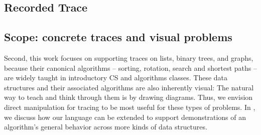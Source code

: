 \begin{comment}
\subsection{Data Palette}
The teacher or student begins by setting up an example on which an algorithm
will be traced. This can be done by dragging data structures from the Data
Palette onto the stage (\fig{fig:visual_vocab}). Each data structure can be
initialized by entering a numeric value into a prompt (list elements can be set
by entering a comma-separated list of numbers). CodeInk's current visual
vocabulary supports numeric values, which is sufficient for explaining most
sorting and search algorithms. We discuss extensions of the vocabulary in the
future work section. The \emph{finger} can be used to express the current
traversal point in an algorithm, like a \emph{curr} pointer. In an educational
setting, the finger replaces the instructor pointing to a particular object
during lecture.
\end{comment}



\subsection{Recorded Trace}


\subsection{Scope: concrete traces and visual problems}
Second, this work focuses on supporting traces on lists, binary trees, and
graphs, because their canonical algorithms -- sorting, rotation, search and
shortest paths -- are widely taught in introductory CS and algorithms classes.
These data structures and their associated algorithms are also inherently
visual: The natural way to teach and think through them is by drawing diagrams.
Thus, we envision direct manipulation for tracing to be most useful for these
types of problems.
In , we discuss how our language can be extended
to support demonstrations of an algorithm's general behavior across more kinds
of data structures.
